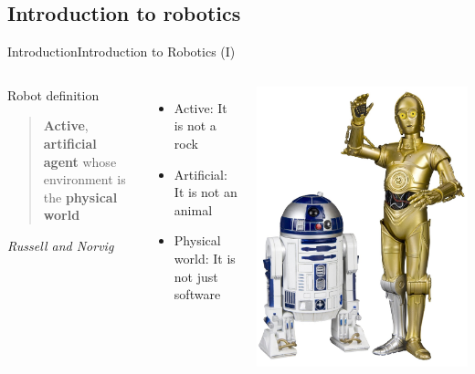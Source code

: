 \documentclass[10pt,compress]{beamer} %
\begin{document}
\subsection{Introduction to robotics}
\begin{frame}{Introduction}{Introduction to Robotics (I)}
    \begin{columns}
	   \begin{block}{Robot definition}
	   \begin{quote}
	   \textbf{Active}, \textbf{artificial agent} whose environment is the \textbf{physical
	   world} 
	   \end{quote}
	   \begin{flushright}
	   	\textit{Russell and Norvig}
		\end{flushright}
	   \end{block}
		\begin{itemize}
			\item Active: It is not a rock
			\item Artificial: It is not an animal
			\item Physical world: It is not just software
		\end{itemize}
			\centering\includegraphics[width=0.8\linewidth]{figs/c3po.jpg}
	\end{columns}
\end{frame}
\end{document}
